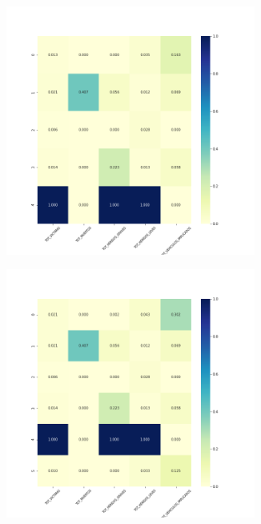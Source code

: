 \begin{figure}[H]
\begin{subfigure}{.5\textwidth}
\end{subfigure}
\begin{subfigure}{.5\textwidth}
  \centering
  \includegraphics[width=0.9\textwidth]{imagenes/case1/agglomerative/heatmaps/hm_agglomerative_case1_salida_k5.png}
\end{subfigure}
\begin{subfigure}{.5\textwidth}
  \centering
  \includegraphics[width=0.9\textwidth]{imagenes/case1/agglomerative/heatmaps/hm_agglomerative_case1_salida_k6.png}

\end{subfigure}
\end{figure}
